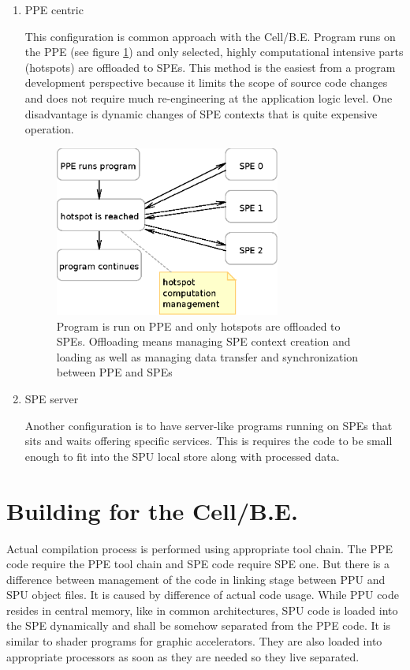 \begin{enumerate}
\item PPE centric
\par
This configuration is common approach with the \mbox{Cell/B.E.}
Program runs on the PPE (see figure \ref{fg:PPUCentricModel}) and only selected, highly computational intensive parts (hotspots) are offloaded to SPEs.
This method is the easiest from a program development perspective because it limits the scope of source code changes and does not require much re-engineering at the application logic level.
One disadvantage is dynamic changes of SPE contexts that is quite expensive operation.

\begin{figure}
    \centering
    \includegraphics[width=0.7\textwidth]{data/PPUCentricModel}
    \caption[PPE centric configuration]{Program is run on PPE and only hotspots are offloaded to SPEs.
 Offloading means managing SPE context creation and loading as well as managing data transfer and synchronization between PPE and SPEs}
    \label{fg:PPUCentricModel}
\end{figure}

\item SPE server
\par
Another configuration is to have server-like programs running on SPEs that sits and waits offering specific services.
This is requires the code to be small enough to fit into the SPU local store along with processed data.

\end{enumerate}

\section {Building for the \mbox{Cell/B.E.}}
\par
Actual compilation process is performed using appropriate tool chain.
The PPE code require the PPE tool chain and SPE code require SPE one.
But there is a difference between management of the code in linking stage between PPU and SPU object files.
It is caused by difference of actual code usage.
While PPU code resides in central memory, like in common architectures, SPU code is loaded into the SPE dynamically and shall be somehow separated from the PPE code.
It is similar to shader programs for graphic accelerators.
They are also loaded into appropriate processors as soon as they are needed so they live separated.

